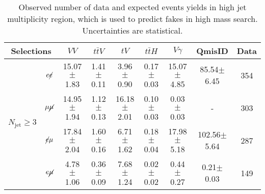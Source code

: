 \begin{table}[!ht]
\begin{center}
\small
\begin{tabular}{c|c|cccc|c|c|c}
\hline
\hline
\multicolumn{2}{c|}{ Selections}                      &$VV$  &$t\bar{t}V$    &$tV$    &$t\bar{t}H$     &$V\gamma$  &QmisID  &Data \\
\hline\multirow{4}{*}{$ N_{\text{jet}} \geq 3$}  &$e\cancel{e}$ &15.07$\pm$1.83    &1.41$\pm$0.11    &3.96$\pm$0.90    &0.17$\pm$0.03    &15.07$\pm$4.85    &85.54$\pm$6.45    &354 \\
\cline{2-9}                                                &$\mu\cancel{\mu}$ &14.95$\pm$1.94    &1.12$\pm$0.13    &16.18$\pm$2.01    &0.10$\pm$0.03    &0.03$\pm$0.03    &-    &303 \\
\cline{2-9}                                                &$\cancel{e}\mu$ &17.84$\pm$2.04    &1.60$\pm$0.16    &6.71$\pm$1.62    &0.18$\pm$0.04    &17.98$\pm$5.18    &102.56$\pm$5.64    &287\\
\cline{2-9}                                                &$e\cancel{\mu}$ &4.78$\pm$1.06    &0.36$\pm$0.09    &7.68$\pm$1.24    &0.02$\pm$0.02    &0.44$\pm$0.27    &0.21$\pm$0.03    &149\\
\hline
\hline
\end{tabular}
\caption{Observed number of data and expected events yields in high jet multiplicity region, which is used to predict fakes in high mass search. Uncertainties are statistical.}
\label{tab:high_Njet_CR_eventyield}
\end{center}
\end{table}
